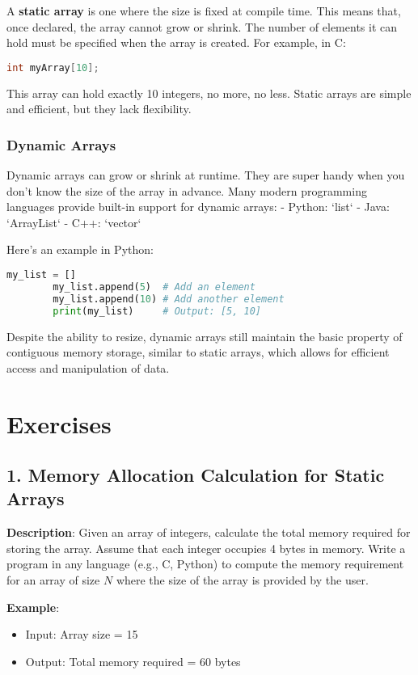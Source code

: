 \documentclass[12pt, oneside]{book}
\begin{document}
	A \textbf{static array} is one where the size is fixed at compile time. This means that, once declared, the array cannot grow or shrink. The number of elements it can hold must be specified when the array is created.
	For example, in C:
	\begin{lstlisting}[language=C]
		int myArray[10];
	\end{lstlisting}
	This array can hold exactly 10 integers, no more, no less. Static arrays are simple and efficient, but they lack flexibility.
	
	\subsubsection{Dynamic Arrays}
	Dynamic arrays can grow or shrink at runtime. They are super handy when you don’t know the size of the array in advance. Many modern programming languages provide built-in support for dynamic arrays:  
	- Python: `list`  
	- Java: `ArrayList`  
	- C++: `vector`  
	
	Here’s an example in Python:
	\begin{lstlisting}[language=Python]
		my_list = []
		my_list.append(5)  # Add an element
		my_list.append(10) # Add another element
		print(my_list)     # Output: [5, 10]
	\end{lstlisting}
	Despite the ability to resize, dynamic arrays still maintain the basic property of contiguous memory storage, similar to static arrays, which allows for efficient access and manipulation of data.
	\section{Exercises}
	\subsection*{1. Memory Allocation Calculation for Static Arrays}
	\textbf{Description}: Given an array of integers, calculate the total memory required for storing the array. Assume that each integer occupies 4 bytes in memory. Write a program in any language (e.g., C, Python) to compute the memory requirement for an array of size \( N \) where the size of the array is provided by the user.
	
	\textbf{Example}:
	\begin{itemize}
		\item Input: Array size = 15
		\item Output: Total memory required = 60 bytes
	\end{itemize}
	
\end{document}
